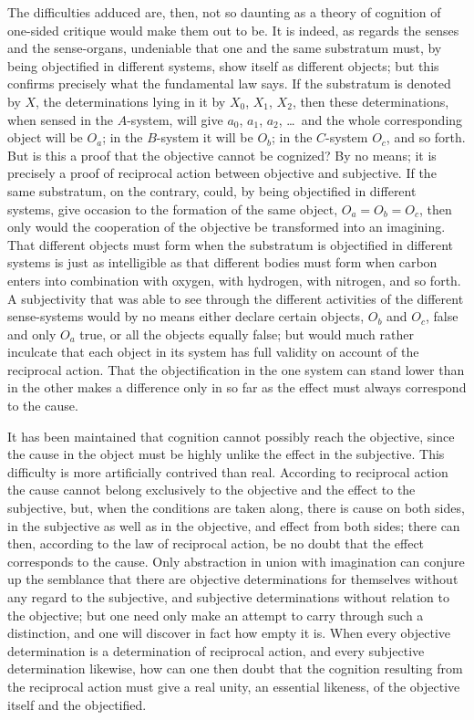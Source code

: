 \documentclass[12pt]{book}
\begin{document}
The difficulties adduced are, then, not so daunting as a theory of cognition of
one-sided critique would make them out to be. It is indeed, as regards the
senses and the sense-organs, undeniable that one and the same substratum must,
by being objectified in different systems, show itself as different objects;
but this confirms precisely what the fundamental law says. If the substratum is
denoted by $X$, the determinations lying in it by $X_0$, $X_1$, $X_2$, then
these determinations, when sensed in the $A$-system, will give $a_0$, $a_1$,
$a_2$, \ldots\ and the whole corresponding object will be $O_a$; in the
$B$-system it will be $O_b$; in the $C$-system $O_c$, and so forth. But is this
a proof that the objective cannot be cognized? By no means; it is precisely a
proof of reciprocal action between objective and subjective. If the same
substratum, on the contrary, could, by being objectified in different systems,
give occasion to the formation of the same object, $O_a = O_b = O_c$, then only
would the cooperation of the objective be transformed into an imagining. That
different objects must form when the substratum is objectified in different
systems is just as intelligible as that different bodies must form when carbon
enters into combination with oxygen, with hydrogen, with nitrogen, and so
forth. A subjectivity that was able to see through the different activities of
the different sense-systems would by no means either declare certain objects,
$O_b$ and $O_c$, false and only $O_a$ true, or all the objects equally false;
but would much rather inculcate that each object in its system has full
validity on account of the reciprocal action. That the objectification in the
one system can stand lower than in the other makes a difference only in so far
as the effect must always correspond to the cause.

It has been maintained that cognition cannot possibly reach the objective,
since the cause in the object must be highly unlike the effect in the
subjective. This difficulty is more artificially contrived than real.
According to reciprocal action the cause cannot belong exclusively to the
objective and the effect to the subjective, but, when the conditions are taken
along, there is cause on both sides, in the subjective as well as in the
objective, and effect from both sides; there can then, according to the law of
reciprocal action, be no doubt that the effect corresponds to the cause. Only
abstraction in union with imagination can conjure up the semblance that there
are objective determinations for themselves without any regard to the
subjective, and subjective determinations without relation to the objective; but
one need only make an attempt to carry through such a distinction, and one will
discover in fact how empty it is. When every objective determination is a
determination of reciprocal action, and every subjective determination
likewise, how can one then doubt that the cognition resulting from the
reciprocal action must give a real unity, an essential likeness, of the
objective itself and the objectified.
\end{document}
